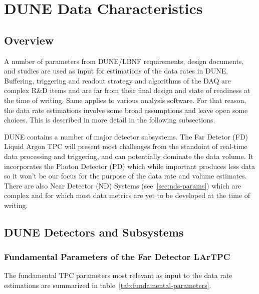 \section{DUNE Data Characteristics}
\label{sec:data-characteristics}
\subsection{Overview}

A number of parameters from DUNE/LBNF requirements, design documents,  and studies are used  as input
for estimations of the data rates in DUNE.
Buffering, triggering and readout strategy and algorithms of the DAQ
are complex R\&D items and are far from their final design and state of
readiness at the time of writing. Same applies to various analysis software.
For that reason, the data rate estimations involve some broad assumptions
and leave open some choices. This is described in more detail in the following subsections.

DUNE contains a number of major detector subsystems. The Far Detetor (FD) Liquid Argon TPC will present most
challenges from the standoint of real-time data processing and triggering, and can potentially dominate the data volume.
It incorporates the Photon Detector (PD) which while important produces less data so it won't be our focus
for the purpose of the data rate and volume estimates. There are also Near
Detector (ND) Systems (see~\ref{sec:nds-params}) which are complex and for which most data metrics are yet to be developed
at the time of writing.

\subsection{DUNE Detectors and Subsystems}

\subsubsection{Fundamental Parameters of the Far Detector LArTPC}
\label{sec:fundamental-parameters}

The fundamental TPC parameters most relevant as input to the data rate estimations are summarized in
table~\ref{tab:fundamental-parameters}.

